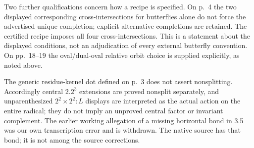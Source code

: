 \documentclass[11pt]{article}
\begin{document}
Two further qualifications concern how a recipe is specified.
On p.~4 the two displayed corresponding cross-intersections for
butterflies alone do not force the advertised unique completion;
explicit alternative completions are retained. The certified
recipe imposes all four cross-intersections. This is a statement
about the displayed conditions, not an adjudication of every
external butterfly convention. On pp.~18--19 the oval/dual-oval
relative orbit choice is supplied explicitly, as noted above.

The generic residue-kernel dot defined on p.~3 does not assert
nonsplitting. Accordingly central $2.2^3$ extensions are proved
nonsplit separately, and unparenthesized $2^2\times2^2:L$ displays
are interpreted as the actual action on the entire radical; they
do not imply an unproved central factor or invariant complement.
The earlier working allegation of a missing horizontal bond in
3.5 was our own transcription error and is withdrawn. The native
source has that bond; it is not among the source corrections.
\end{document}
